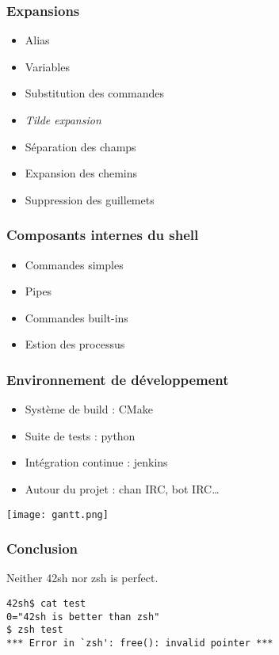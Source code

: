 \documentclass{beamer}
\begin{document}
\begin{frame}
    \frametitle{Expansions}
    \begin{itemize}
        \item Alias
        \item Variables
        \item Substitution des commandes
        \item \emph{Tilde expansion}
        \item Séparation des champs
        \item Expansion des chemins
        \item Suppression des guillemets
    \end{itemize}
\end{frame}

\begin{frame}
    \frametitle{Composants internes du shell}
    \begin{itemize}
        \item Commandes simples
        \item Pipes
        \item Commandes built-ins
        \item Estion des processus
    \end{itemize}
\end{frame}

\begin{frame}
    \frametitle{Environnement de développement}
    \begin{itemize}
        \item Système de build : CMake
        \item Suite de tests : python
        \item Intégration continue : jenkins
        \item Autour du projet : chan IRC, bot IRC\dots
    \end{itemize}
\end{frame}

\begin{frame}
    \texttt{[image: gantt.png]}
\end{frame}

\begin{frame} [fragile]
    \frametitle{Conclusion}
    Neither 42sh nor zsh is perfect.
\begin{verbatim}
42sh$ cat test
0="42sh is better than zsh"
$ zsh test
*** Error in `zsh': free(): invalid pointer ***
\end{verbatim}
\end{frame}
\end{document}
